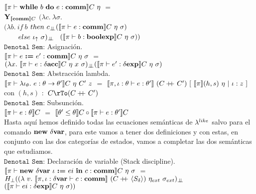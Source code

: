 $\llbracket  \pi \vdash \textbf{while} \ b \ \textbf{do} \ e : \textbf{comm}  \rrbracket C \ \eta$ 
$=$ \\
\indent \indent \indent
$\textbf{Y}_{\llbracket \textbf{comm} \rrbracket C}$ $(\lambda c . \ \lambda \sigma . \ $\\
\indent \indent \indent \indent \indent \indent
$(\lambda b . \ if \ b $ $then \ c_{\bot \!\!\! \bot} (\llbracket \pi \vdash e : \textbf{comm} \rrbracket C \ \eta \ \sigma)$\\
 \indent \indent  \indent \indent \indent \indent \indent \indent \ \ \ \
$else \ \iota_{\uparrow} \ \sigma)_{\bot \!\!\! \bot}$ \
$(\llbracket  \pi \vdash b : \textbf{boolexp} \rrbracket C \ \eta \ \sigma))$\\

\noindent
$\texttt{Denotal Sem:}$ Asignaci\'on.\\

$\llbracket  \pi \vdash e \ \textbf{:=} \ e' : \textbf{comm}  \rrbracket C \ \eta \ \sigma$ 
$=$ \\
\indent \indent \indent \indent \indent 
$(\lambda x . \ \llbracket \pi \vdash e : \delta \textbf{acc} \rrbracket C \ \eta \ x \ \sigma)_{\bot \!\!\! \bot}
(\llbracket  \pi \vdash e' : \delta \textbf{exp}  \rrbracket C \ \eta \ \sigma)$\\

\noindent
$\texttt{Denotal Sem:}$ Abstracci\'on lambda.\\

$\llbracket  \pi \vdash \lambda \iota_{\theta} . \ e : \theta \rightarrow \theta'  \rrbracket C \ \eta \ C' \ z$ 
$=$ 
$\llbracket  \pi,\iota:\theta \vdash e : \theta'  \rrbracket \ (C +\kern-1.3ex+\kern0.8ex C') \
[ \ \llbracket \pi \rrbracket(h,s) \ \eta \ | \ \iota:z \ ]$\\

con $(h,s)$ $:$ $C \rTo (C \concat C')$ \\

\noindent
$\texttt{Denotal Sem:}$ Subsunción.\\

$\llbracket \pi \vdash e : \theta \rrbracket C$ $=$ $\llbracket \theta' \leq \theta \rrbracket C \circ \llbracket \pi \vdash e : \theta' \rrbracket C$\\

Hasta aqu\'i hemos definido todas las ecuaciones sem\'anticas de $\lambda^{like}$ salvo
para el comando $\textbf{new} \ \delta \textbf{var}$, para este vamos a tener dos definiciones
y con estas, en conjunto con las dos categor\'ias de estados, vamos a completar 
las dos sem\'anticas que estudiamos.\\

$\texttt{Denotal Sem:}$ Declaraci\'on de variable (Stack discipline).\\

$\llbracket \pi \vdash \textbf{new} \ \delta \textbf{var} \ \iota \ \textbf{:=} \ ei \ \textbf{in} \ c : \textbf{comm} \rrbracket C \ \eta \ \sigma$ 
$=$ \\ \indent \indent
$H_{\bot} ((\lambda \ v . \ \semBrcks{\pi,\iota:\deltavar \vdash c : \commt}
		\ (C\concat\lrangles{S_\delta}) \ \eta_{ext} \ \sigma_{ext})_{\dbot}$
\\ \indent \indent  \indent  \indent  \indent \indent  \indent
\indent \indent \indent \indent \indent \indent \indent
\indent \indent \indent
$(\llbracket \pi \vdash ei : \delta \textbf{exp} \rrbracket C \ \eta \ \sigma))$\\

